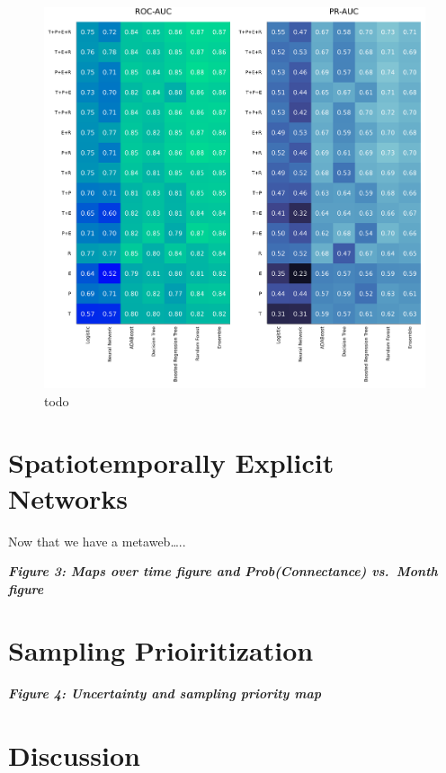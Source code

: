 \documentclass[11pt]{article}
\makeatletter
\def\maxwidth{\ifdim\Gin@nat@width>\linewidth\linewidth
\else\Gin@nat@width\fi}
\let\Oldincludegraphics\includegraphics
\renewcommand{\includegraphics}[1]{\Oldincludegraphics[width=\maxwidth]{#1}}
\makeatother
\begin{document}
\begin{figure}
\centering
\includegraphics{./figures/PR_ROC.png}
\caption{todo}
\end{figure}

\hypertarget{spatiotemporally-explicit-networks}{%
\section{Spatiotemporally Explicit
Networks}\label{spatiotemporally-explicit-networks}}

Now that we have a metaweb\ldots..

\textbf{\emph{Figure 3: Maps over time figure and Prob(Connectance)
vs.~Month figure}}

\hypertarget{sampling-prioiritization}{%
\section{Sampling Prioiritization}\label{sampling-prioiritization}}

\textbf{\emph{Figure 4: Uncertainty and sampling priority map}}

\hypertarget{discussion}{%
\section*{Discussion}\label{discussion}}
\end{document}
